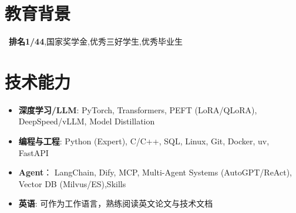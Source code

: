 \documentclass{resume}
\begin{document}


 

\section{教育背景}
\ \textbf{排名1/44},国家奖学金,优秀三好学生,优秀毕业生


\section{技术能力}
\begin{itemize}[parsep=0.2ex]
  \item \textbf{深度学习/LLM}: PyTorch, Transformers, PEFT (LoRA/QLoRA), DeepSpeed/vLLM, Model Distillation
  \item \textbf{编程与工程}: Python (Expert), C/C++, SQL, Linux, Git, Docker, uv, FastAPI
  \item \textbf{Agent}： LangChain, Dify, MCP, Multi-Agent Systems (AutoGPT/ReAct), Vector DB (Milvus/ES),Skills
   \item \textbf{英语}: 可作为工作语言，熟练阅读英文论文与技术文档
\end{itemize}
\end{document}
